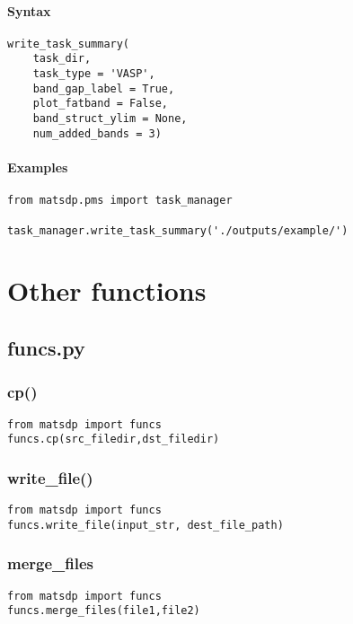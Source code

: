 \documentclass[12pt]{book}
\begin{document}
\subsubsection{Syntax}
\begin{lstlisting}
write_task_summary(
    task_dir, 
    task_type = 'VASP', 
    band_gap_label = True, 
    plot_fatband = False, 
    band_struct_ylim = None, 
    num_added_bands = 3)
\end{lstlisting}
\subsubsection{Examples}
\begin{lstlisting}
from matsdp.pms import task_manager

task_manager.write_task_summary('./outputs/example/')
\end{lstlisting}

\chapter{Other functions}
\section{funcs.py}

\subsection{cp()}

\begin{lstlisting}
from matsdp import funcs
funcs.cp(src_filedir,dst_filedir)
\end{lstlisting}

\subsection{write\_file()}

\begin{lstlisting}
from matsdp import funcs
funcs.write_file(input_str, dest_file_path)
\end{lstlisting}

\subsection{merge\_files}
\begin{lstlisting}
from matsdp import funcs
funcs.merge_files(file1,file2)
\end{lstlisting}
\end{document}
